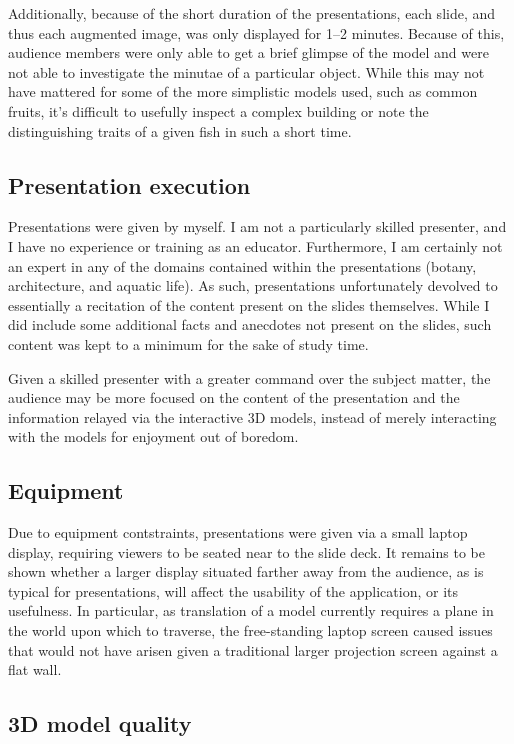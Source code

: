 \documentclass[10pt,journal]{IEEEtran}
\begin{document}
Additionally, because of the short duration of the presentations, each slide,
and thus each augmented image, was only displayed for 1--2 minutes. Because of
this, audience members were only able to get a brief glimpse of the model and
were not able to investigate the minutae of a particular object. While this may
not have mattered for some of the more simplistic models used, such as common
fruits, it's difficult to usefully inspect a complex building or note the
distinguishing traits of a given fish in such a short time.

\subsection{Presentation execution}

Presentations were given by myself. I am not a particularly skilled presenter,
and I have no experience or training as an educator. Furthermore, I am
certainly not an expert in any of the domains contained within the
presentations (botany, architecture, and aquatic life). As such, presentations
unfortunately devolved to essentially a recitation of the content present on
the slides themselves. While I did include some additional facts and anecdotes
not present on the slides, such content was kept to a minimum for the sake of
study time.

Given a skilled presenter with a greater command over the subject matter, the
audience may be more focused on the content of the presentation and the
information relayed via the interactive 3D models, instead of merely
interacting with the models for enjoyment out of boredom.

\subsection{Equipment}

Due to equipment contstraints, presentations were given via a small laptop
display, requiring viewers to be seated near to the slide deck. It remains to
be shown whether a larger display situated farther away from the audience, as
is typical for presentations, will affect the usability of the application, or
its usefulness. In particular, as translation of a model currently requires a
plane in the world upon which to traverse, the free-standing laptop screen
caused issues that would not have arisen given a traditional larger projection
screen against a flat wall.

\subsection{3D model quality}
\end{document}
